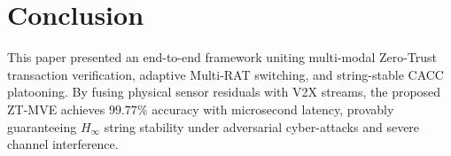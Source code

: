 \documentclass[journal]{IEEEtran}
\begin{document}
\section{Conclusion}
This paper presented an end-to-end framework uniting multi-modal Zero-Trust transaction verification, adaptive Multi-RAT switching, and string-stable CACC platooning. By fusing physical sensor residuals with V2X streams, the proposed ZT-MVE achieves $99.77\%$ accuracy with microsecond latency, provably guaranteeing $H_\infty$ string stability under adversarial cyber-attacks and severe channel interference.



\end{document}
